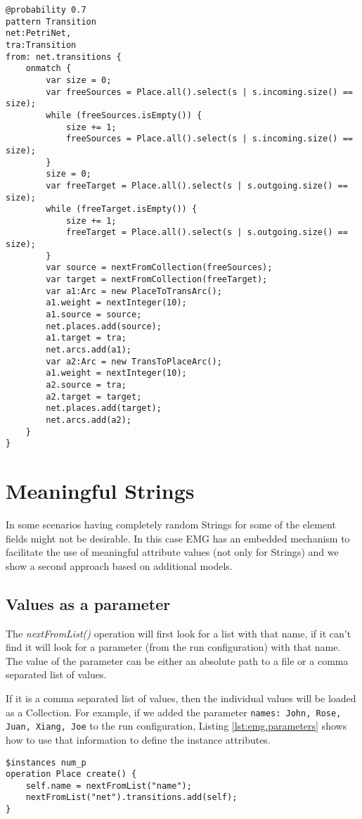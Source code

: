 \begin{lstlisting}[float=h, caption={EMG create operations}, label=lst:emg.match, language=EPL]
@probability 0.7
pattern Transition
net:PetriNet,
tra:Transition
from: net.transitions {
    onmatch {
        var size = 0;
        var freeSources = Place.all().select(s | s.incoming.size() == size);
        while (freeSources.isEmpty()) {
            size += 1;
            freeSources = Place.all().select(s | s.incoming.size() == size);
        }
        size = 0;
        var freeTarget = Place.all().select(s | s.outgoing.size() == size);
        while (freeTarget.isEmpty()) {
            size += 1;
            freeTarget = Place.all().select(s | s.outgoing.size() == size);
        }
        var source = nextFromCollection(freeSources);
        var target = nextFromCollection(freeTarget);
        var a1:Arc = new PlaceToTransArc();
        a1.weight = nextInteger(10);
        a1.source = source;
        net.places.add(source);
        a1.target = tra;
        net.arcs.add(a1);
        var a2:Arc = new TransToPlaceArc();
        a1.weight = nextInteger(10);
        a2.source = tra;
        a2.target = target;
        net.places.add(target);
        net.arcs.add(a2);
    }
}
\end{lstlisting}

\section{Meaningful Strings}
In some scenarios having completely random Strings for some of the element fields might not be desirable. In this case EMG has an embedded mechanism to facilitate the use of meaningful attribute values (not only for Strings) and we show a second approach based on additional models.

\subsection{Values as a parameter}
The \emph{nextFromList()} operation will first look for a list with that name, if it can't find it will look for a parameter (from the run configuration) with that name. The value of the parameter can be either an absolute path to a file or a comma separated list of values.

If it is a comma separated list of values, then the individual values will be loaded as a Collection. For example, if we added the parameter \texttt{names: John, Rose, Juan, Xiang, Joe} to the run configuration, Listing \ref{lst:emg.parameters} shows how to use that information to define the instance attributes.
\begin{lstlisting}[float=h, caption={EMG create operations}, label=lst:emg.parameters, language=EOL]
$instances num_p
operation Place create() {
    self.name = nextFromList("name");
    nextFromList("net").transitions.add(self);
}
\end{lstlisting}

